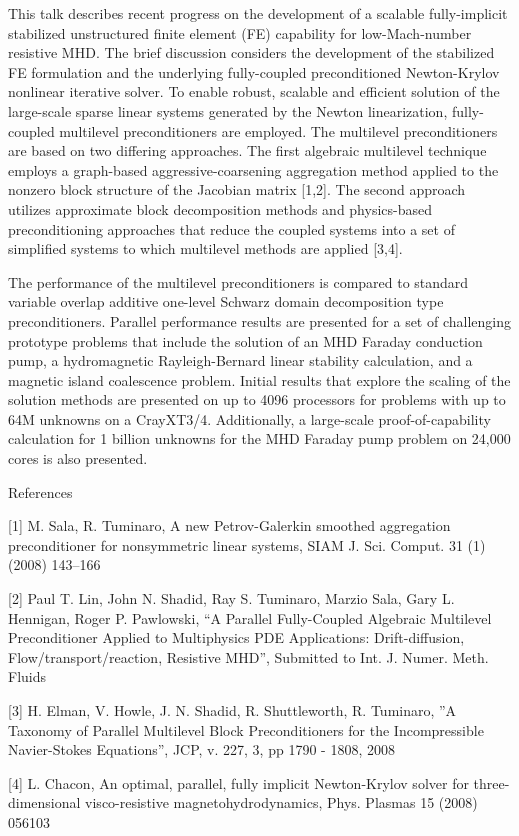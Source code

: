 \documentclass{report}
\begin{document}
This talk describes recent progress on the development of a scalable
fully-implicit stabilized unstructured finite element (FE) capability for
low-Mach-number resistive MHD. The brief discussion considers the
development of the stabilized FE formulation and the underlying
fully-coupled preconditioned Newton-Krylov nonlinear iterative solver. To
enable robust, scalable and efficient solution of the large-scale sparse
linear systems generated by the Newton linearization, fully-coupled
multilevel preconditioners are employed. The multilevel preconditioners
are based on two differing approaches. The first algebraic multilevel
technique employs a graph-based aggressive-coarsening aggregation method
applied to the nonzero block structure of the Jacobian matrix [1,2]. The
second approach utilizes approximate block decomposition methods and
physics-based preconditioning approaches that reduce the coupled systems
into a set of simplified systems to which multilevel methods are applied
[3,4].

The performance of the multilevel preconditioners is compared to standard
variable overlap additive one-level Schwarz domain decomposition type
preconditioners. Parallel performance results are presented for a set of
challenging prototype problems that include the solution of an MHD
Faraday conduction pump, a hydromagnetic Rayleigh-Bernard linear
stability calculation, and a magnetic island coalescence problem. Initial
results that explore the scaling of the solution methods are presented on
up to 4096 processors for problems with up to 64M unknowns on a
CrayXT3/4. Additionally, a large-scale proof-of-capability calculation
for 1 billion unknowns for the MHD Faraday pump problem on 24,000 cores
is also presented.


References

[1] M. Sala, R. Tuminaro, A new Petrov-Galerkin smoothed aggregation
preconditioner for nonsymmetric linear systems, SIAM J. Sci. Comput. 31
(1) (2008) 143–166

[2] Paul T. Lin, John N. Shadid, Ray S. Tuminaro, Marzio Sala, Gary L.
Hennigan, Roger P. Pawlowski, “A Parallel Fully-Coupled Algebraic
Multilevel Preconditioner Applied to Multiphysics PDE Applications:
Drift-diffusion, Flow/transport/reaction, Resistive MHD”, Submitted to
Int. J. Numer. Meth. Fluids

[3] H. Elman, V. Howle, J. N. Shadid, R. Shuttleworth, R. Tuminaro, ”A
Taxonomy of Parallel Multilevel Block Preconditioners for the
Incompressible Navier-Stokes Equations”, JCP, v. 227, 3, pp 1790 -
1808, 2008

[4] L. Chacon, An optimal, parallel, fully implicit Newton-Krylov solver
for three-dimensional visco-resistive magnetohydrodynamics, Phys. Plasmas
15 (2008) 056103
\end{document}
